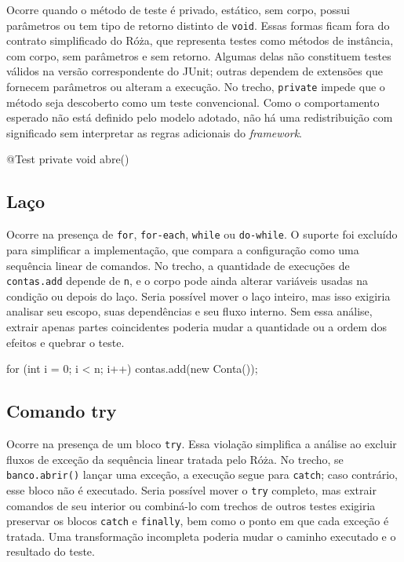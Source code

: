Ocorre quando o método de teste é privado, estático, sem corpo, possui parâmetros ou tem tipo de retorno distinto de \texttt{void}. Essas formas ficam fora do contrato simplificado do Róża, que representa testes como métodos de instância, com corpo, sem parâmetros e sem retorno. Algumas delas não constituem testes válidos na versão correspondente do JUnit; outras dependem de extensões que fornecem parâmetros ou alteram a execução. No trecho, \texttt{private} impede que o método seja descoberto como um teste convencional. Como o comportamento esperado não está definido pelo modelo adotado, não há uma redistribuição com significado sem interpretar as regras adicionais do \textit{framework}.

\begin{violationexample}
@Test private void abre() {}
\end{violationexample}

\subsection{Laço}

Ocorre na presença de \texttt{for}, \texttt{for-each}, \texttt{while} ou \texttt{do-while}. O suporte foi excluído para simplificar a implementação, que compara a configuração como uma sequência linear de comandos. No trecho, a quantidade de execuções de \texttt{contas.add} depende de \texttt{n}, e o corpo pode ainda alterar variáveis usadas na condição ou depois do laço. Seria possível mover o laço inteiro, mas isso exigiria analisar seu escopo, suas dependências e seu fluxo interno. Sem essa análise, extrair apenas partes coincidentes poderia mudar a quantidade ou a ordem dos efeitos e quebrar o teste.

\begin{violationexample}
for (int i = 0; i < n; i++) {
    contas.add(new Conta());
}
\end{violationexample}

\subsection{Comando try}

Ocorre na presença de um bloco \texttt{try}. Essa violação simplifica a análise ao excluir fluxos de exceção da sequência linear tratada pelo Róża. No trecho, se \texttt{banco.abrir()} lançar uma exceção, a execução segue para \texttt{catch}; caso contrário, esse bloco não é executado. Seria possível mover o \texttt{try} completo, mas extrair comandos de seu interior ou combiná-lo com trechos de outros testes exigiria preservar os blocos \texttt{catch} e \texttt{finally}, bem como o ponto em que cada exceção é tratada. Uma transformação incompleta poderia mudar o caminho executado e o resultado do teste.

